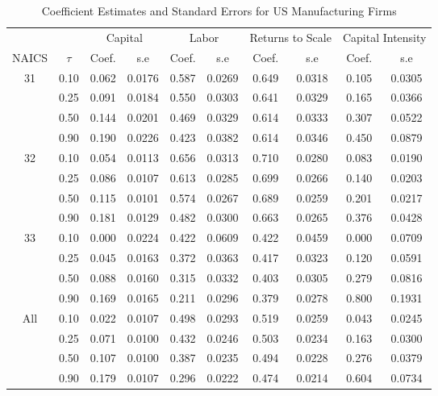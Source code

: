\begin{table}[ht]
\centering
\caption{Coefficient Estimates and Standard Errors for US Manufacturing Firms} 
\begin{tabular}{cccccccccc}
  \hline\hline & & \multicolumn{2}{c}{Capital}  & \multicolumn{2}{c}{Labor} & \multicolumn{2}{c}{Returns to Scale} & \multicolumn{2}{c}{Capital Intensity}\\ \cmidrule(lr){3-4} \cmidrule(lr){5-6} \cmidrule(lr){7-8} \cmidrule(lr){9-10}NAICS & $\tau$ & Coef. & s.e & Coef. & s.e & Coef. & s.e & Coef. & s.e \\ 
  \hline
31 & 0.10 & 0.062 & 0.0176 & 0.587 & 0.0269 & 0.649 & 0.0318 & 0.105 & 0.0305 \\ 
   & 0.25 & 0.091 & 0.0184 & 0.550 & 0.0303 & 0.641 & 0.0329 & 0.165 & 0.0366 \\ 
   & 0.50 & 0.144 & 0.0201 & 0.469 & 0.0329 & 0.614 & 0.0333 & 0.307 & 0.0522 \\ 
   & 0.90 & 0.190 & 0.0226 & 0.423 & 0.0382 & 0.614 & 0.0346 & 0.450 & 0.0879 \\ 
  32 & 0.10 & 0.054 & 0.0113 & 0.656 & 0.0313 & 0.710 & 0.0280 & 0.083 & 0.0190 \\ 
   & 0.25 & 0.086 & 0.0107 & 0.613 & 0.0285 & 0.699 & 0.0266 & 0.140 & 0.0203 \\ 
   & 0.50 & 0.115 & 0.0101 & 0.574 & 0.0267 & 0.689 & 0.0259 & 0.201 & 0.0217 \\ 
   & 0.90 & 0.181 & 0.0129 & 0.482 & 0.0300 & 0.663 & 0.0265 & 0.376 & 0.0428 \\ 
  33 & 0.10 & 0.000 & 0.0224 & 0.422 & 0.0609 & 0.422 & 0.0459 & 0.000 & 0.0709 \\ 
   & 0.25 & 0.045 & 0.0163 & 0.372 & 0.0363 & 0.417 & 0.0323 & 0.120 & 0.0591 \\ 
   & 0.50 & 0.088 & 0.0160 & 0.315 & 0.0332 & 0.403 & 0.0305 & 0.279 & 0.0816 \\ 
   & 0.90 & 0.169 & 0.0165 & 0.211 & 0.0296 & 0.379 & 0.0278 & 0.800 & 0.1931 \\ 
  All & 0.10 & 0.022 & 0.0107 & 0.498 & 0.0293 & 0.519 & 0.0259 & 0.043 & 0.0245 \\ 
   & 0.25 & 0.071 & 0.0100 & 0.432 & 0.0246 & 0.503 & 0.0234 & 0.163 & 0.0300 \\ 
   & 0.50 & 0.107 & 0.0100 & 0.387 & 0.0235 & 0.494 & 0.0228 & 0.276 & 0.0379 \\ 
   & 0.90 & 0.179 & 0.0107 & 0.296 & 0.0222 & 0.474 & 0.0214 & 0.604 & 0.0734 \\ 
   \hline
\end{tabular}
\end{table}

